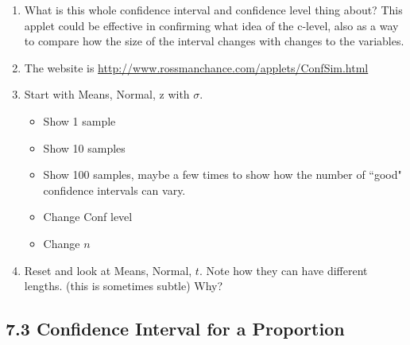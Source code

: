 \documentclass{ccg-topic}
\begin{document}
\begin{enumerate}

    \item What is this whole confidence interval and confidence level thing about? This applet could be effective in confirming what idea of the c-level, also as a way to compare how the size of the interval changes with changes to the variables.
    
    \item The website is \url{http://www.rossmanchance.com/applets/ConfSim.html}
    
    \item Start with Means, Normal, z with $\sigma$.
    
        \begin{itemize}
        
            \item Show 1 sample
            
            \item Show 10 samples
            
            \item Show 100 samples, maybe a few times to show how the number of ``good" confidence intervals can vary.
            
            \item Change Conf level
            
            \item Change $n$
            
        \end{itemize}
        
    \item Reset and look at Means, Normal, $t$. Note how they can have different lengths. (this is sometimes subtle)  Why?
    
\end{enumerate}

\subsection*{7.3 Confidence Interval for a Proportion}
\end{document}
